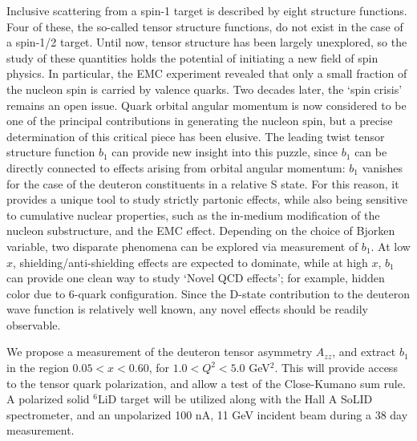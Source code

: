 Inclusive scattering from a spin-1 target is described by                                     
eight structure functions. Four of these, the so-called tensor structure functions, 
do not exist in the case of a spin-1/2 target.  Until now, tensor structure has been 
largely unexplored, so the study of these quantities holds the potential of 
initiating a new field of spin physics.
In particular, the EMC experiment revealed that only a small fraction
of the nucleon spin is carried by valence quarks.
Two decades later, the `spin crisis' remains an open issue. 
Quark orbital angular momentum is now considered to be one of the principal 
contributions in generating the nucleon spin, but a precise determination of this
critical piece has been elusive. The leading twist tensor structure function
$b_1$ 
can provide 
new insight into this puzzle, since $b_1$ can be directly connected to effects arising from 
orbital angular momentum:  $b_1$ vanishes for the case of the deuteron constituents
 in a relative S state.  For this reason, 
it provides a unique tool to study strictly partonic effects, while also being sensitive to 
cumulative nuclear properties, such as the in-medium modification of the nucleon substructure, and the EMC effect.
Depending on the choice of Bjorken variable, two disparate phenomena can be explored via measurement
of $b_1$. At low $x$, shielding/anti-shielding effects are expected to dominate, 
while at  high $x$, $b_1$ can provide one clean way to study `Novel QCD effects';
for example, hidden color due to 6-quark configuration. Since the D-state contribution to the 
deuteron wave function is relatively well known, any novel effects should be 
readily observable.


We propose a measurement of the deuteron tensor asymmetry $A_{zz}$, and extract $b_1$ in the region $0.05<x<0.60$, 
for $1.0<Q^2<5.0$ GeV$^2$.  This  will provide  access to the tensor quark polarization, and allow a test of the 
Close-Kumano sum rule. A polarized solid $^6$LiD target will be utilized along with the Hall A SoLID spectrometer,
and an unpolarized  100 nA, 11 GeV incident beam during a 38 day measurement.









